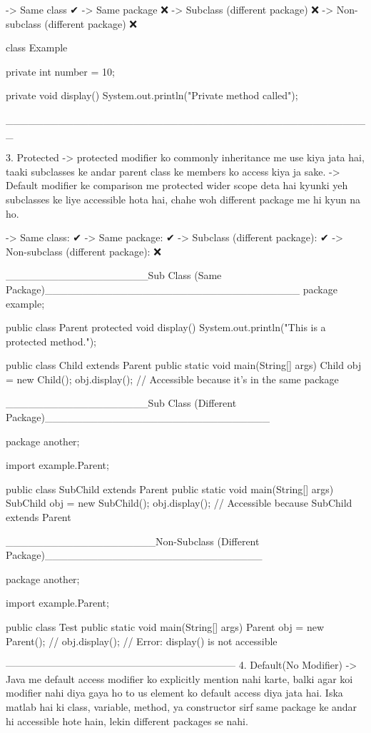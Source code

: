 -> Same class ✔
-> Same package ❌
-> Subclass (different package) ❌
-> Non-subclass (different package) ❌

class Example {
    private int number = 10;

    private void display() {
        System.out.println("Private method called");
    }
}


_________________________________________________

3. Protected -> protected modifier ko commonly inheritance me use kiya jata hai, taaki subclasses ke andar parent class ke members ko access kiya ja sake.
-> Default modifier ke comparison me protected wider scope deta hai kyunki yeh subclasses ke liye accessible hota hai, chahe woh different package me hi kyun na ho.


-> Same class: ✔
-> Same package: ✔
-> Subclass (different package): ✔
-> Non-subclass (different package): ❌

___________________Sub Class (Same Package)__________________________________
package example;

public class Parent {
    protected void display() {
        System.out.println("This is a protected method.");
    }
}

public class Child extends Parent {
    public static void main(String[] args) {
        Child obj = new Child();
        obj.display(); // Accessible because it's in the same package
    }
}

___________________Sub Class (Different Package)______________________________


package another;

import example.Parent;

public class SubChild extends Parent {
    public static void main(String[] args) {
        SubChild obj = new SubChild();
        obj.display(); // Accessible because SubChild extends Parent
    }
}

____________________Non-Subclass (Different Package)_____________________________

package another;

import example.Parent;

public class Test {
    public static void main(String[] args) {
        Parent obj = new Parent();
        // obj.display(); // Error: display() is not accessible
    }
}






---------------------------------------------------------------------
4. Default(No Modifier) -> Java me default access modifier ko explicitly mention nahi karte, balki agar koi modifier nahi diya gaya ho to us element ko default access diya jata hai. Iska matlab hai ki class, variable, method, ya constructor sirf same package ke andar hi accessible hote hain, lekin different packages se nahi.

